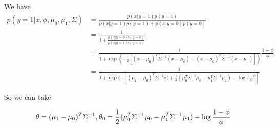 \begin{answer}
We have
$$
\begin{aligned}
p(y=1|x, \phi, \mu_0, \mu_1, \Sigma) &= \frac{p(x|y=1)p(y=1)}{p(x|y=1)p(y=1) + p(x|y=0)p(y=0)}\\
&= \frac{1}{1 + \frac{p(x|y=0)p(y=0)}{p(x|y=1)p(y=1)}}\\
&= \frac{1}{1 + \exp(-\frac{1}{2}[(x - \mu_0)^T\Sigma^{-1}(x - \mu_0) -(x - \mu_0)^T\Sigma^{-1}(x - \mu_0)])}\frac{1 - \phi}{\phi}\\
&= \frac{1}{1 + \exp(-[(\mu_1 - \mu_0)^T\Sigma^{-1}x  ) + \frac{1}{2}(\mu_0^T\Sigma^{-1}\mu_0 - \mu_1^T\Sigma^{-1}\mu_1) - \log\frac{1-\phi}{\phi}]}
\end{aligned}
$$

So we can take 

$$
\theta = (\mu_1 - \mu_0)^T\Sigma^{-1},\\ 
\theta_0 = \frac{1}{2}(\mu_0^T\Sigma^{-1}\mu_0 - \mu_1^T\Sigma^{-1}\mu_1) - \log\frac{1-\phi}{\phi}
$$

\end{answer}
